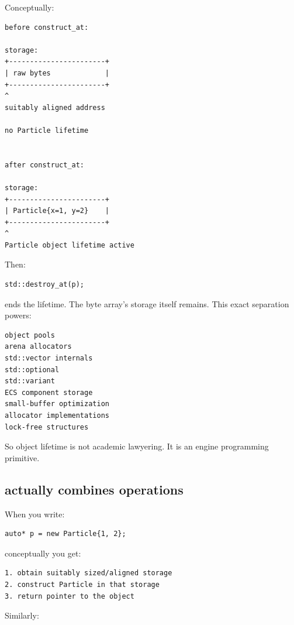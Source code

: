 Conceptually:

\begin{verbatim}
before construct_at:

storage:
+-----------------------+
| raw bytes             |
+-----------------------+
^
suitably aligned address

no Particle lifetime


after construct_at:

storage:
+-----------------------+
| Particle{x=1, y=2}    |
+-----------------------+
^
Particle object lifetime active
\end{verbatim}

Then:

\begin{verbatim}
std::destroy_at(p);
\end{verbatim}

ends the  lifetime. The byte array's storage itself remains. This exact separation powers:

\begin{verbatim}
object pools
arena allocators
std::vector internals
std::optional
std::variant
ECS component storage
small-buffer optimization
allocator implementations
lock-free structures
\end{verbatim}

So object lifetime is not academic lawyering. It is an engine programming primitive.

\subsection{\texorpdfstring{ actually combines operations}{new actually combines operations}}\label{05-engine-i-ch002-new-actually-combines-operations}

\hypertarget{05-engine-i-ch002-new-actually-combines-operations}{}

When you write:

\begin{verbatim}
auto* p = new Particle{1, 2};
\end{verbatim}

conceptually you get:

\begin{verbatim}
1. obtain suitably sized/aligned storage
2. construct Particle in that storage
3. return pointer to the object
\end{verbatim}

Similarly:

